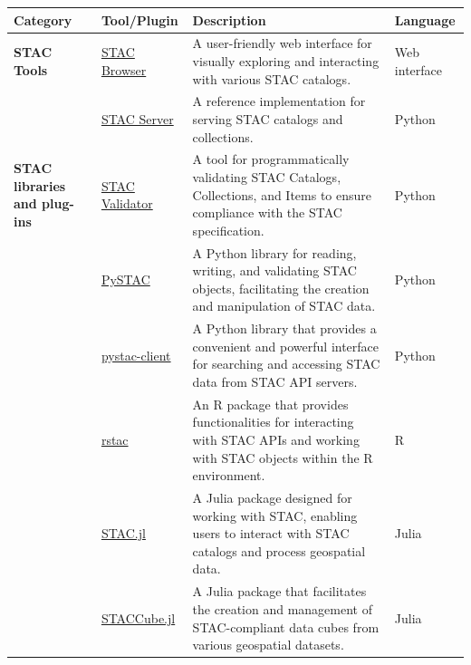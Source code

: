 \documentclass[
  letterpaper,
  DIV=11,
  numbers=noendperiod]{scrreprt}
\begin{document}
\begin{longtable}[]{@{}
  >{\raggedright\arraybackslash}p{}
  >{\raggedright\arraybackslash}p{}
  >{\raggedright\arraybackslash}p{}
  >{\raggedright\arraybackslash}p{}@{}}
\toprule\noalign{}
\begin{minipage}[b]{\linewidth}\raggedright
Category
\end{minipage} & \begin{minipage}[b]{\linewidth}\raggedright
Tool/Plugin
\end{minipage} & \begin{minipage}[b]{\linewidth}\raggedright
Description
\end{minipage} & \begin{minipage}[b]{\linewidth}\raggedright
Language
\end{minipage} \\
\midrule\noalign{}
\endhead
\bottomrule\noalign{}
\endlastfoot
\textbf{STAC Tools} &
\href{https://github.com/radiantearth/stac-browser}{STAC Browser} & A
user-friendly web interface for visually exploring and interacting with
various STAC catalogs. & Web interface \\
& \href{https://github.com/stac-utils/stac-server}{STAC Server} & A
reference implementation for serving STAC catalogs and collections. &
Python \\
\textbf{STAC libraries and plug-ins} &
\href{https://github.com/stac-utils/stac-validator}{STAC Validator} & A
tool for programmatically validating STAC Catalogs, Collections, and
Items to ensure compliance with the STAC specification. & Python \\
& \href{https://github.com/stac-utils/pystac}{PySTAC} & A Python library
for reading, writing, and validating STAC objects, facilitating the
creation and manipulation of STAC data. & Python \\
& \href{https://pystac-client.readthedocs.io/en/stable/}{pystac-client}
& A Python library that provides a convenient and powerful interface for
searching and accessing STAC data from STAC API servers. & Python \\
& \href{https://github.com/brazil-data-cube/rstac}{rstac} & An R package
that provides functionalities for interacting with STAC APIs and working
with STAC objects within the R environment. & R \\
& \href{https://github.com/JuliaClimate/STAC.jl}{STAC.jl} & A Julia
package designed for working with STAC, enabling users to interact with
STAC catalogs and process geospatial data. & Julia \\
& \href{https://github.com/felixcremer/STACCube.jl}{STACCube.jl} & A
Julia package that facilitates the creation and management of
STAC-compliant data cubes from various geospatial datasets. & Julia \\
\end{longtable}
\end{document}
